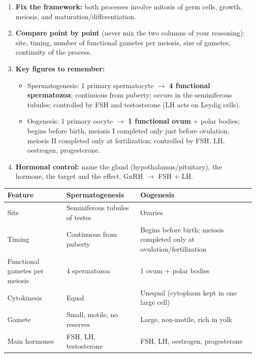 \documentclass[11pt]{article}
\newcommand{\cle}[1]{{\popxbold\color{popdark}#1}}
\begin{document}
\begin{methode}
\begin{enumerate}
\item \textbf{Fix the framework:} both processes involve \cle{mitosis} of germ cells, growth, \cle{meiosis}, and maturation/differentiation.
\item \textbf{Compare point by point} (never mix the two columns of your reasoning): site, timing, number of functional gametes per meiosis, size of gametes, continuity of the process.
\item \textbf{Key figures to remember:}
\begin{itemize}
\item Spermatogenesis: 1 primary spermatocyte $\to$ \textbf{4 functional spermatozoa}; continuous from puberty; occurs in the seminiferous tubules; controlled by FSH and testosterone (LH acts on Leydig cells).
\item Oogenesis: 1 primary oocyte $\to$ \textbf{1 functional ovum} + polar bodies; begins before birth, meiosis I completed only just before ovulation, meiosis II completed only at fertilization; controlled by FSH, LH, oestrogen, progesterone.
\end{itemize}
\item \textbf{Hormonal control:} name the gland (hypothalamus/pituitary), the hormone, the target and the effect. GnRH $\to$ FSH + LH.
\end{enumerate}
\end{methode}

\begin{center}
\begin{tabularx}{\linewidth}{|l|X|X|}
\hline
\rowcolor{popblueL} \textbf{Feature} & \textbf{Spermatogenesis} & \textbf{Oogenesis} \\
\hline
Site & Seminiferous tubules of testes & Ovaries \\
\hline
Timing & Continuous from puberty & Begins before birth; meiosis completed only at ovulation/fertilization \\
\hline
Functional gametes per meiosis & 4 spermatozoa & 1 ovum + polar bodies \\
\hline
Cytokinesis & Equal & Unequal (cytoplasm kept in one large cell) \\
\hline
Gamete & Small, motile, no reserves & Large, non-motile, rich in yolk \\
\hline
Main hormones & FSH, LH, testosterone & FSH, LH, oestrogen, progesterone \\
\hline
\end{tabularx}
\end{center}
\end{document}
